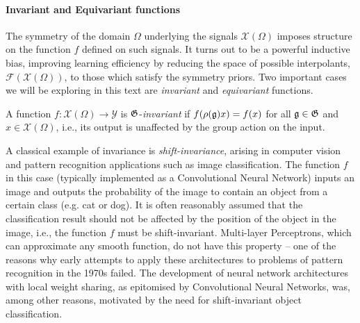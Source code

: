 \paragraph{Invariant and Equivariant functions}

The symmetry of the domain $\Omega$ underlying the signals $\mathcal{X}(\Omega)$ imposes structure on the function $f$ defined on such signals. 
%
It turns out to be a powerful inductive bias, improving learning efficiency by reducing the space of possible interpolants, $\mathcal{F}(\mathcal{X}(\Omega))$, to those which satisfy the symmetry priors. 
%
%
Two important cases we will be exploring in this text are {\em invariant} and {\em equivariant} functions. 




\begin{tcolorbox}[width=\linewidth,
                  boxsep=0pt,
                  left=7.5pt,
                  right=7.5pt,
                  top=7.5pt,
                  bottom=7.5pt,
                  arc=0pt,
                  boxrule=0pt,toprule=0pt,
                  colback=boxgray,
                  ]%
    A function $f: \mathcal{X}(\Omega) \rightarrow \mathcal{Y}$ is ${\mathfrak{G}}$-{\em invariant} if 
    $
    f(\rho({\mathfrak{g}})x) = f(x)$  for all ${\mathfrak{g}} \in {\mathfrak{G}}$ and $x \in \mathcal{X}(\Omega)$, i.e., its output is unaffected by the group action on the input. 
\end{tcolorbox}


A classical example of invariance is {\em shift-invariance}, 
arising in computer vision and pattern recognition applications such as image classification. The function $f$ in this case (typically implemented as a Convolutional Neural Network) inputs an image and outputs the probability of the image to contain an object from a certain class (e.g. cat or dog). %
%
It is often reasonably assumed that the classification result should not be affected by the position of the object in the image, i.e., the function $f$ must be shift-invariant. 
%
Multi-layer Perceptrons, which can approximate any smooth function, do not have this property -- one of the reasons why early attempts to apply these architectures to problems of pattern recognition in the 1970s failed. 
%
The development of neural network architectures with local weight sharing, as epitomised by Convolutional Neural Networks, was, among other reasons, motivated by the need for shift-invariant object classification. 


